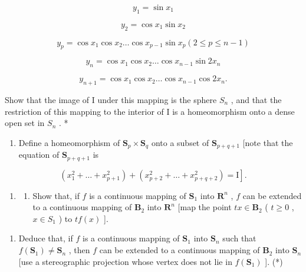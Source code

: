 \[
y _ {1} = \sin x _ {1}
\]

\[
{y _ {2}} {= \cos x _ {1} \sin x _ {2}}
\]

\[
y _ {p} = \cos x _ {1} \cos x _ {2} \dots \cos x _ {p - 1} \sin x _ {p} (2 \leqslant p \leqslant n - 1)
\]

\[
y _ {n} = \cos x _ {1} \cos x _ {2} \dots \cos x _ {n - 1} \sin 2 x _ {n}
\]

\[
y _ {n + 1} = \cos x _ {1} \cos x _ {2} \dots \cos x _ {n - 1} \cos 2 x _ {n}.
\]

Show that the image of I under this mapping is the sphere \(S_{n}\) , and that the restriction of this mapping to the interior of I is a homeomorphism onto a dense open set in \(S_{n}\) . *

\begin{enumerate}
\def\labelenumi{\arabic{enumi})}
\setcounter{enumi}{1}
\tightlist
\item
  Define a homeomorphism of \(\mathbf{S}_p \times \mathbf{S}_q\) onto a subset of \(\mathbf{S}_{p + q + 1}\) {[}note that the equation of \(\mathbf{S}_{p + q + 1}\) is
\end{enumerate}

\[
\left. \left(x _ {1} ^ {2} + \dots + x _ {p + 1} ^ {2}\right) + \left(x _ {p + 2} ^ {2} + \dots + x _ {p + q + 2} ^ {2}\right) = \mathrm{I} \right].
\]

\begin{enumerate}
\def\labelenumi{\arabic{enumi})}
\setcounter{enumi}{2}
\tightlist
\item
  \begin{enumerate}
  \def\labelenumii{\alph{enumii})}
  \tightlist
  \item
    Show that, if \(f\) is a continuous mapping of \(\mathbf{S}_1\) into \(\mathbf{R}^n\) , \(f\) can be extended to a continuous mapping of \(\mathbf{B}_2\) into \(\mathbf{R}^n\) {[}map the point \(tx \in \mathbf{B}_2\) ( \(t \geqslant 0\) , \(x \in S_1\) ) to \(tf(x)\) {]}.
  \end{enumerate}
\end{enumerate}

\begin{enumerate}
\def\labelenumi{\alph{enumi})}
\setcounter{enumi}{1}
\tightlist
\item
  Deduce that, if \(f\) is a continuous mapping of \(\mathbf{S}_1\) into \(\mathbf{S}_n\) such that \(f(\mathbf{S}_1) \neq \mathbf{S}_n\) , then \(f\) can be extended to a continuous mapping of \(\mathbf{B}_2\) into \(\mathbf{S}_n\) {[}use a stereographic projection whose vertex does not lie in \(f(\mathbf{S}_1)\) {]}. (*)
\end{enumerate}

